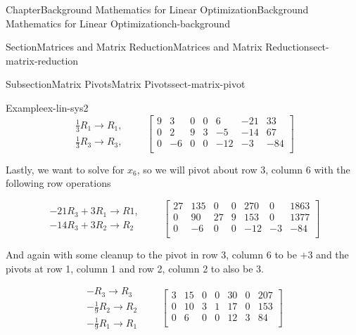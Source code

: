 \documentclass[oneside,10pt,]{book}
\numberwithin{equation}{section}
\newcommand{\amp}{&}
\begin{document}
\begin{chapterptx}{Chapter}{Background Mathematics for Linear Optimization}{}{Background Mathematics for Linear Optimization}{}{}{ch-background}
\begin{sectionptx}{Section}{Matrices and Matrix Reduction}{}{Matrices and Matrix Reduction}{}{}{sect-matrix-reduction}
\begin{subsectionptx}{Subsection}{Matrix Pivots}{}{Matrix Pivots}{}{}{sect-matrix-pivot}
\begin{example}{Example}{}{ex-lin-sys2}
\begin{equation*}
\begin{array}{r} \frac{1}{3} R_1 \to R_1, \\\frac{1}{3} R_3 \to R_3, \end{array} \qquad \left[\begin{array}{rrrrrr|r} 9 \amp 3 \amp 0 \amp 0 \amp 6 \amp -21 \amp 33\\ 0 \amp 2 \amp 9 \amp 3 \amp -5 \amp -14 \amp 67\\ 0 \amp -6 \amp 0 \amp 0 \amp -12 \amp -3 \amp -84\\ \end{array} \right]
\end{equation*}
%
\par
Lastly, we want to solve for \(x_6\), so we will pivot about row 3, column 6 with the following row operations%
\par
%
\begin{equation*}
\begin{array}{r} -21R_3 + 3R_1 \to R1, \\ -14R_3 + 3R_2 \to R_2 \end{array} \qquad \left[\begin{array}{rrrrrr|r} 27 \amp 135 \amp 0 \amp 0 \amp 270 \amp 0 \amp 1863\\ 0 \amp 90 \amp 27 \amp 9 \amp 153 \amp 0 \amp 1377\\ 0 \amp -6 \amp 0 \amp 0 \amp -12 \amp -3 \amp -84\\ \end{array} \right]
\end{equation*}
%
\par
And again with some cleanup to the pivot in row 3, column 6 to be \(+3\) and the pivots at row 1, column 1 and row 2, column 2 to also be \(3\).%
\par
%
\begin{equation*}
\begin{array}{r} -R_3 \to R_3 \\ -\frac{1}{9}R_2 \to R_2 \\ -\frac{1}{9} R_1 \to R_1 \end{array} \qquad \left[\begin{array}{rrrrrr|r} 3 \amp 15 \amp 0 \amp 0 \amp 30 \amp 0 \amp 207\\ 0 \amp 10 \amp 3 \amp 1 \amp 17 \amp 0 \amp 153\\ 0 \amp 6 \amp 0 \amp 0 \amp 12 \amp 3 \amp 84\\ \end{array} \right]
\end{equation*}

\end{example}
\end{subsectionptx}
\end{sectionptx}
\end{chapterptx}
\end{document}
